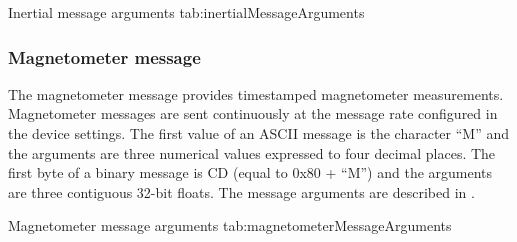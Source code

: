 \begingroup
    \def\tempArgumentA{Gyroscope X axis in degrees per second}
    \def\tempArgumentB{Gyroscope Y axis in degrees per second}
    \def\tempArgumentC{Gyroscope Z axis in degrees per second}
    \def\tempArgumentD{Accelerometer X axis in g}
    \def\tempArgumentE{Accelerometer Y axis in g}
    \def\tempArgumentF{Accelerometer Z axis in g}
    \dataMessageTable
    {Inertial message arguments}
    {tab:inertialMessageArguments}
\endgroup

\begingroup
    \def\tempNameA{Gyroscope X axis}
    \def\tempNameB{Gyroscope Y axis}
    \def\tempNameC{Gyroscope Z axis}
    \def\tempNameD{Accelerometer X axis}
    \def\tempNameE{Accelerometer Y axis}
    \def\tempNameF{Accelerometer Z axis}
    \def\tempValueA{0}
    \def\tempValueB{0}
    \def\tempValueC{0}
    \def\tempValueD{0}
    \def\tempValueE{0}
    \def\tempValueF{1}
    \def\tempAsciiFirst{I}
    \def\tempAsciiA{0.0000}
    \def\tempAsciiB{0.0000}
    \def\tempAsciiC{0.0000}
    \def\tempAsciiD{0.0000}
    \def\tempAsciiE{0.0000}
    \def\tempAsciiF{1.0000}
    \def\tempBinaryFirst{C9}
    \def\tempBinaryA{00 00 00 00}
    \def\tempBinaryB{00 00 00 00}
    \def\tempBinaryC{00 00 00 00}
    \def\tempBinaryD{00 00 00 00}
    \def\tempBinaryE{00 00 00 00}
    \def\tempBinaryF{00 00 80 3F}
    \dataMessageExample
\endgroup

\subsubsection{Magnetometer message}

The magnetometer message provides timestamped magnetometer measurements.  Magnetometer messages are sent continuously at the message rate configured in the device settings.  The first value of an \ac{ASCII} message is the character \enquote{M} and the arguments are three numerical values expressed to four decimal places.  The first byte of a binary message is CD (equal to 0x80 + \enquote{M}) and the arguments are three contiguous 32-bit floats.  The message arguments are described in .

\begingroup
    \def\tempArgumentA{Magnetometer X axis in \acs{a.u.}}
    \def\tempArgumentB{Magnetometer Y axis in \acs{a.u.}}
    \def\tempArgumentC{Magnetometer Z axis in \acs{a.u.}}
    \dataMessageTable
    {Magnetometer message arguments}
    {tab:magnetometerMessageArguments}
\endgroup

\begingroup
    \def\tempNameA{Magnetometer X axis}
    \def\tempNameB{Magnetometer Y axis}
    \def\tempNameC{Magnetometer Z axis}
    \def\tempValueA{1.0}
    \def\tempValueB{0.0}
    \def\tempValueC{0.0}
    \def\tempAsciiFirst{M}
    \def\tempAsciiA{1.0000}
    \def\tempAsciiB{0.0000}
    \def\tempAsciiC{0.0000}
    \def\tempBinaryFirst{CD}
    \def\tempBinaryA{00 00 80 3F}
    \def\tempBinaryB{00 00 00 00}
    \def\tempBinaryC{00 00 00 00}
    \dataMessageExample
\endgroup

